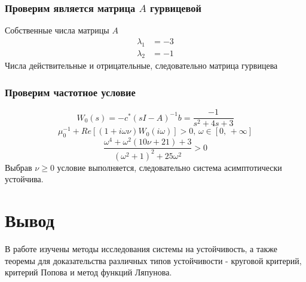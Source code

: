     \subsubsection*{Проверим является матрица $A$ гурвицевой}
    Собственные числа матрицы $A$
    \begin{equation*}
        \begin{aligned}
            \lambda_1 &= -3 \\
            \lambda_2 &= -1
        \end{aligned}
    \end{equation*}
    Числа действительные и отрицательные, следовательно матрица гурвицева

    \subsubsection*{Проверим частотное условие}
    \[W_0(s) = -c^*(sI - A)^{-1}b = \dfrac{-1}{s^2 + 4s + 3}\]
    \[\mu_0^{-1} + Re\left[ \left( 1 + i\omega\nu \right) W_0(i\omega) \right] > 0, \,
    \omega \in \left[ 0,\, +\infty \right]\]
    \[\dfrac{\omega^4 + \omega^2(10\nu +21) + 3}{(\omega^2 + 1)^2 +25\omega^2} > 0 \]
    Выбрав $\nu \geq 0$ условие выполняется, следовательно система асимптотически устойчива.


    \section*{Вывод}
    В работе изучены методы исследования системы на устойчивость, а также теоремы для доказательства различных типов устойчивости -
    круговой критерий, критерий Попова и метод функций Ляпунова.


